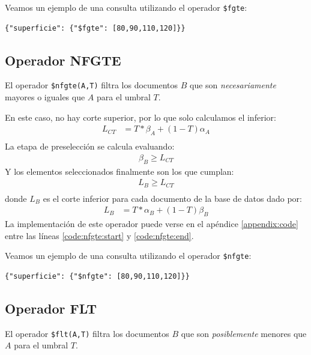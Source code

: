 \begin{example}
Veamos un ejemplo de una consulta utilizando el operador \texttt{\$fgte}:
%
\begin{verbatim}
{"superficie": {"$fgte": [80,90,110,120]}}
\end{verbatim}

\end{example}

\subsection{Operador NFGTE}

El operador \texttt{\$nfgte(A,T)} filtra los documentos $B$ que son \textit{necesariamente} mayores o iguales que $A$ para el umbral $T$.

En este caso, no hay corte superior, por lo que solo calculamos el inferior:
%
\begin{align*}
    L_{CT} &= T * \beta_A + (1-T)\alpha_A \\
\end{align*}
%
La etapa de preselección se calcula evaluando:
%
\begin{align*}
    \beta_B \geq L_{CT}
\end{align*}
%
Y los elementos seleccionados finalmente son los que cumplan:
%
\begin{align*}
    L_B \geq L_{CT} \\
\end{align*}
%
donde $L_B$ es el corte inferior para cada documento de la base de datos dado por:
%
\begin{align*}
    L_B &= T * \alpha_B + (1-T)\beta_B
\end{align*}
%
La implementación de este operador puede verse en el apéndice \ref{appendix:code} entre las líneas \ref{code:nfgte:start} y \ref{code:nfgte:end}.

\begin{example}
Veamos un ejemplo de una consulta utilizando el operador \texttt{\$nfgte}:
%
\begin{verbatim}
{"superficie": {"$nfgte": [80,90,110,120]}}
\end{verbatim}

\end{example}

\subsection{Operador FLT}

El operador \texttt{\$flt(A,T)} filtra los documentos $B$ que son \textit{posiblemente} menores que $A$ para el umbral $T$.

